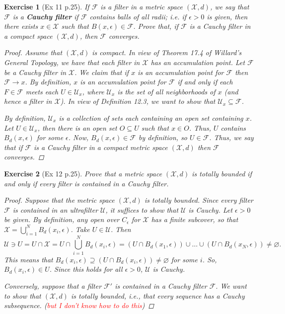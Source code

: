 \documentclass[11pt]{article}
\newtheorem{exercise}{Exercise}
\newcommand{\F}{\mathcal{F}}
\newcommand{\X}{\mathcal{X}}
\begin{document}
\begin{exercise}[Ex 11 p.25]
If $\mathcal{F}$ is a filter in a metric space $(\X , d)$, we say that $\F$ is a \textbf{Cauchy filter} if $\F$ contains balls of all radii; i.e. if $\epsilon > 0$ is given, then there exists $x \in \X$ such that $B(x, \epsilon) \in \F.$ Prove that, if $\F$ is a Cauchy filter in a compact space $(\X , d)$, then $\F$ converges.

	\begin{proof}
	Assume that $(\X,d)$ is compact. In view of Theorem 17.4 of Willard's \textit{General Topology}, we have that each filter in $\X$ has an accumulation point. Let $\F$ be a Cauchy filter in $\X$. We claim that if $x$ is an accumulation point for $\F$ then $\F \to x$. By definition, $x$ is an accumulation point for $\F$ if and only if each $F\in \F$ meets each $U\in \mathcal{U}_x$, where $\mathcal{U}_x$ is the set of all neighborhoods of $x$ (and hence a filter in $\X$). In view of Definition 12.3, we want to show that $\mathcal{U}_x \subseteq \F$. 
	
	By definition, $\mathcal{U}_x$ is a collection of sets each containing an open set containing $x$. Let $U\in \mathcal{U}_x$, then there is an open set $O \subseteq U$ such that $x\in O$. Thus, $U$ contains $B_d(x,\epsilon)$ for some $\epsilon$. Now, $B_d(x,\epsilon) \in \F$ by definition, so $U\in \F$. Thus, we say that if $\F$ is a Cauchy filter in a compact metric space $(\X,d)$ then $\F$ converges.  
	\end{proof}
\end{exercise}

\begin{exercise}[Ex 12 p.25]
	Prove that a metric space $(\X , d)$ is totally bounded if and only if every filter is contained in a Cauchy filter. 
	\begin{proof}
		Suppose that the metric space $(\X,d)$ is totally bounded. Since every filter $\F$ is contained in an ultrafilter $\mathcal{U}$, it suffices to show that $\mathcal{U}$ is Cauchy. Let $\epsilon > 0$ be given. By definition, any open over $C_\epsilon$ for $\X$ has a finite subcover, so that $\X = \bigcup_{i=1}^N B_d(x_i,\epsilon)$.  Take $U\in \mathcal{U}$. Then 
		\begin{equation*}
		\mathcal{U}\ni U = U\cap \X = U \cap \bigcup^N_{i=1} B_d(x_i,\epsilon) = (U \cap B_d(x_1,\epsilon)) \cup \dots \cup (U \cap B_d(x_N,\epsilon)) \neq \varnothing.
		\end{equation*}
		This means that $B_d(x_i, \epsilon) \supseteq (U \cap B_d(x_i,\epsilon)) \neq \varnothing$ for some $i$. So, $B_d(x_i,\epsilon) \in U$. Since this holds for all $\epsilon >0$, $\mathcal{U}$ is Cauchy.
		
		
		Conversely, suppose that a filter $\F'$ is contained in a Cauchy filter $\F$. We want to show that $(\X,d)$ is totally bounded, i.e., that every sequence has a Cauchy subsequence. (\textcolor{red}{but I don't know how to do this}) 	
	\end{proof}
\end{exercise}
\end{document}
